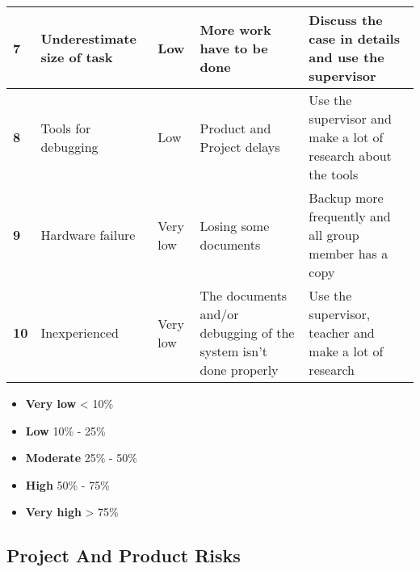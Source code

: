 \begin{center}
\begin{tabular}{ | l | p{4cm} | l | p{4cm} | p{4cm} |}
		\textbf{7} & Underestimate size of task & Low & More work have to be done & Discuss the case in details and use the supervisor \\ \hline
		
		\textbf{8} & Tools for debugging & Low & Product and Project delays & Use the supervisor and make a lot of research about the tools \\ \hline
		
		\textbf{9} & Hardware failure & Very low & Losing some documents & Backup more frequently and all group member has a copy \\ \hline
		
		\textbf{10} & Inexperienced & Very low & The documents and/or debugging of the system isn’t done properly & Use the supervisor, teacher and make a lot of research \\
		
      \hline
    \end{tabular}
\end{center}

{\renewcommand\labelitemi{}
\begin{itemize} \textbf{Probability:}\\
	\item \textbf{Very low} < 10\% \\
	\item \textbf{Low} 10\% - 25\% \\
	\item \textbf{Moderate} 25\% - 50\% \\
	\item \textbf{High} 50\% - 75\% \\
	\item \textbf{Very high} > 75\% \\
\end{itemize}
}

\subsection*{Project And Product Risks}


